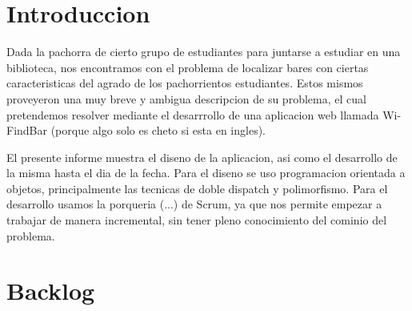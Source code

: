 \documentclass[10pt,a4paper]{article}
\begin{document}
\begin{comment}
\hline \hline
\multirow{3}{2cm}{Registrarme} & Crear entorno de programacion & 2 & \\ \cline{2-4}
& Verificar datos y agregarlos a la base de datos & 5 & \\ \cline{2-4}
& Crear interfaz grafica & 2 & 9\\ \cline{1-4}
\hline \hline
\multirow{3}{2cm}{Loguearme} & Crear entorno de programacion & 2 & \\ \cline{2-4}
& Verificar datos & 1 & \\ \cline{2-4}
& Crear interfaz grafica & 1 & 4\\ \cline{1-4}
\hline \hline
\multirow{3}{2cm}{Eliminar bar} & Crear entorno de programacion & 2 & \\ \cline{2-4}
& Verificar datos del bar& 1 & \\ \cline{2-4}
& Verificar datos del usuario& 1 & \\ \cline{2-4}
& Eliminar datos de la base de datos& 5 & \\ \cline{2-4}
& Crear interfaz grafica & 3 & 13\\ \cline{1-4}

\end{tabular}
\end{center}
\end{table}
\end{comment}

\section{Introduccion}

Dada la pachorra de cierto grupo de estudiantes para juntarse a estudiar en una biblioteca, nos encontramos con el problema de localizar bares con ciertas caracteristicas del 
agrado de los pachorrientos estudiantes. Estos mismos proveyeron una muy breve y ambigua descripcion de su problema, el cual pretendemos resolver mediante el desarrrollo de una 
aplicacion web llamada Wi-FindBar (porque algo solo es cheto si esta en ingles). 

El presente informe muestra el diseno de la aplicacion, asi como el desarrollo de la misma hasta el dia de la fecha. Para el diseno se uso programacion orientada a objetos, 
principalmente las tecnicas de doble dispatch y polimorfismo. Para el desarrollo usamos la porqueria (...) de Scrum, ya que nos permite empezar a trabajar de manera incremental, sin tener
pleno conocimiento del cominio del problema.

\section{Backlog}
\end{document}
